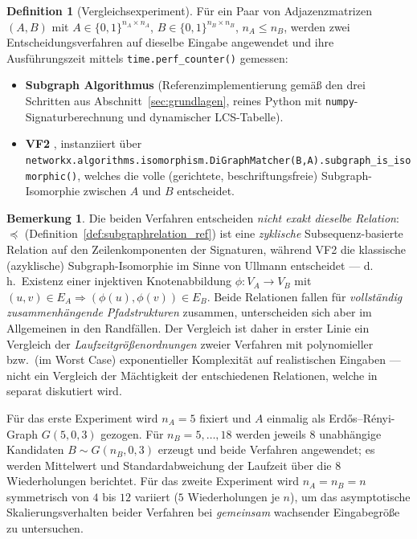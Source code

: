 \documentclass[a4paper,12pt, twoside]{report}
\theoremstyle{definition}
\newtheorem{definition}{Definition}
\newtheorem{bemerkung}{Bemerkung}
\begin{document}
\begin{definition}[Vergleichsexperiment]
	\label{def:vergleich}
	Für ein Paar von Adjazenzmatrizen $(A,B)$ mit $A\in\{0,1\}^{n_A\times n_A}$, $B\in\{0,1\}^{n_B\times n_B}$, $n_A\le n_B$, werden zwei Entscheidungsverfahren auf dieselbe Eingabe angewendet und ihre Ausführungszeit mittels \texttt{time.perf\_counter()} gemessen:
	\begin{itemize}
		\item \textbf{Subgraph Algorithmus} (Referenzimplementierung gemäß den drei Schritten aus Abschnitt~\ref{sec:grundlagen}, reines Python mit \texttt{numpy}-Signaturberechnung und dynamischer LCS-Tabelle).
		\item \textbf{VF2} \cite{cordella2004}, instanziiert über \texttt{networkx.algorithms.\allowbreak isomorphism.DiGraphMatcher(B,A).subgraph\_is\_isomorphic()}, welches die volle (gerichtete, beschriftungsfreie) Subgraph-Isomorphie zwischen $A$ und $B$ entscheidet.
	\end{itemize}
\end{definition}

\begin{bemerkung}
	Die beiden Verfahren entscheiden \emph{nicht exakt dieselbe Relation}: $\preceq$ (Definition~\ref{def:subgraphrelation_ref}) ist eine \emph{zyklische} Subsequenz-basierte Relation auf den Zeilenkomponenten der Signaturen, während VF2 die klassische (azyklische) Subgraph-Isomorphie im Sinne von Ullmann \cite{ullmann1976} entscheidet — d.\,h.\ Existenz einer injektiven Knotenabbildung $\phi:V_A\to V_B$ mit $(u,v)\in E_A\Rightarrow(\phi(u),\phi(v))\in E_B$. Beide Relationen fallen für \emph{vollständig zusammenhängende Pfadstrukturen} zusammen, unterscheiden sich aber im Allgemeinen in den Randfällen. Der Vergleich ist daher in erster Linie ein Vergleich der \emph{Laufzeitgrößenordnungen} zweier Verfahren mit polynomieller bzw.\ (im Worst Case) exponentieller Komplexität auf realistischen Eingaben — nicht ein Vergleich der Mächtigkeit der entschiedenen Relationen, welche in \cite{epp2026subgraph} separat diskutiert wird.
\end{bemerkung}

Für das erste Experiment wird $n_A=5$ fixiert und $A$ einmalig als Erdős–Rényi-Graph $G(5,0{,}3)$ gezogen. Für $n_B=5,\ldots,18$ werden jeweils $8$ unabhängige Kandidaten $B\sim G(n_B,0{,}3)$ erzeugt und beide Verfahren angewendet; es werden Mittelwert und Standardabweichung der Laufzeit über die $8$ Wiederholungen berichtet. Für das zweite Experiment wird $n_A=n_B=n$ symmetrisch von $4$ bis $12$ variiert ($5$ Wiederholungen je $n$), um das asymptotische Skalierungsverhalten beider Verfahren bei \emph{gemeinsam} wachsender Eingabegröße zu untersuchen.
\end{document}
